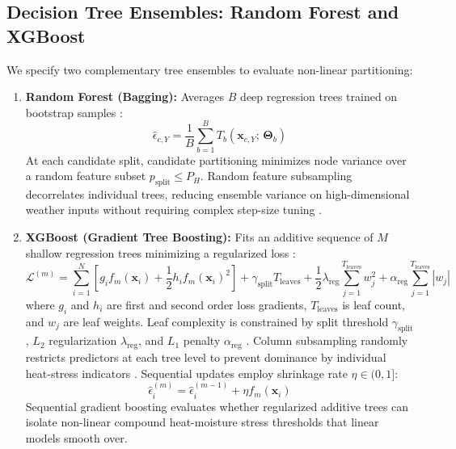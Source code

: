 \subsection{Decision Tree Ensembles: Random Forest and XGBoost}
\label{sec:meth_trees}

We specify two complementary tree ensembles to evaluate non-linear partitioning:
\begin{enumerate}
    \item \textbf{Random Forest (Bagging):} Averages $B$ deep regression trees trained on bootstrap samples \citep{Sharmaetal2025}:
    \begin{equation}
        \hat{\epsilon}_{c,Y} = \frac{1}{B} \sum_{b=1}^B T_b\left(\mathbf{x}_{c,Y}; \, \mathbf{\Theta}_b\right)
        \label{eq:rf_prediction}
    \end{equation}
    At each candidate split, candidate partitioning minimizes node variance over a random feature subset $p_{\text{split}} \le P_H$. Random feature subsampling decorrelates individual trees, reducing ensemble variance on high-dimensional weather inputs without requiring complex step-size tuning \citep{James2023}.
    \item \textbf{XGBoost (Gradient Tree Boosting):} Fits an additive sequence of $M$ shallow regression trees minimizing a regularized loss \citep{Torsonietal2023}:
    \begin{equation}
        \mathcal{L}^{(m)} = \sum_{i=1}^{N} \left[ g_i f_m(\mathbf{x}_i) + \frac{1}{2} h_i f_m(\mathbf{x}_i)^2 \right] + \gamma_{\text{split}} T_{\text{leaves}} + \frac{1}{2} \lambda_{\text{reg}} \sum_{j=1}^{T_{\text{leaves}}} w_j^2 + \alpha_{\text{reg}} \sum_{j=1}^{T_{\text{leaves}}} |w_j|
        \label{eq:xgboost_objective}
    \end{equation}
    where $g_i$ and $h_i$ are first and second order loss gradients, $T_{\text{leaves}}$ is leaf count, and $w_j$ are leaf weights. Leaf complexity is constrained by split threshold $\gamma_{\text{split}}$, $L_2$ regularization $\lambda_{\text{reg}}$, and $L_1$ penalty $\alpha_{\text{reg}}$ \citep{Geron2025}. Column subsampling randomly restricts predictors at each tree level to prevent dominance by individual heat-stress indicators \citep{James2023}. Sequential updates employ shrinkage rate $\eta \in (0, 1]$:
    \begin{equation}
        \hat{\epsilon}_i^{(m)} = \hat{\epsilon}_i^{(m-1)} + \eta f_m(\mathbf{x}_i)
        \label{eq:xgboost_update}
    \end{equation}
    Sequential gradient boosting evaluates whether regularized additive trees can isolate non-linear compound heat-moisture stress thresholds that linear models smooth over.
\end{enumerate}


